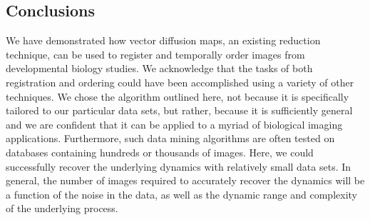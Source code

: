 \documentclass{pnastwo}
\makeatletter
\newcommand{\customlabel}[2]{%
\protected@write \@auxout {}{\string \newlabel {#1}{{#2}{}}}}
\makeatother
\begin{document}
\begin{article}

\section{Conclusions}

We have demonstrated how vector diffusion maps, an existing reduction technique, can be used to register and temporally order images from developmental biology studies.
%
We acknowledge that the tasks of both registration and ordering could have been accomplished using a variety of other techniques.
%
We chose the algorithm outlined here, not because it is specifically tailored to our particular data sets, but rather, because it is sufficiently general and we are confident that it can be applied to a myriad of biological imaging applications.
%
Furthermore, such data mining algorithms are often tested on databases containing hundreds or thousands of images.
%
Here, we could successfully recover the underlying dynamics with relatively small data sets.
%
In general, the number of images required to accurately recover the dynamics will be a function of the noise in the data, as well as the dynamic range and complexity of the underlying process.


\end{article}
\end{document}
